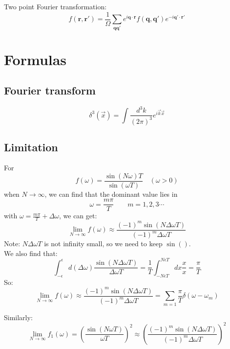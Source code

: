 Two point Fourier transformation:
\begin{equation}
    \displaystyle f(\bm{r,r'}) = \frac{1}{\Omega}\sum_{\bm{qq'}}e^{i\bm{q\cdot r}}f(\bm{q,q'})e^{-i\bm{q'\cdot r'}}
\end{equation}

\section{Formulas}

\subsection{Fourier transform}
\[
    \delta^3(\vec{x})=\int\frac{d^3k}{(2\pi)^3}e^{i\vec{k}\vec{x}}
    \]
\subsection{Limitation}
For 
\[
    f(\omega) = \frac{\sin(N\omega)T}{\sin(\omega T)}   \quad (\omega > 0)
    \]
when $N\rightarrow\infty$, 
we can find that the dominant value lies in 
\[
    \omega = \frac{m\pi}{T} \qquad  m=1,2,3 \cdots
    \]
with $\omega=\frac{m\pi}{T}+\Delta\omega$, we can get:
\begin{equation}
    \displaystyle \lim_{N\rightarrow\infty}f(\omega)\approx\frac{(-1)^m\sin(N\Delta\omega T)}{(-1)^m\Delta\omega T}
\end{equation}
Note: $N\Delta\omega T$ is not infinity small, so we need to keep $\sin()$. \\
We also find that:
\begin{equation}
    \int_{-\epsilon}^{\epsilon}d(\Delta\omega)\frac{\sin(N\Delta\omega T)}{\Delta\omega T}
    =\frac{1}{T}\int_{-N\epsilon T}^{N\epsilon T} dx\frac{x}{x} = \frac{\pi}{T}
\end{equation}
So: 
\begin{equation}
    \displaystyle \lim_{N\rightarrow\infty}f(\omega)\approx\frac{(-1)^m\sin(N\Delta\omega T)}{(-1)^m\Delta\omega T}
    =\displaystyle \sum_{m=1}\frac{\pi}{T}\delta({\omega-\omega_m})
\end{equation}

Similarly:
\begin{equation}
    \displaystyle \lim_{N\rightarrow\infty}f_1(\omega)=\left(\frac{\sin(N\omega T)}{\omega T}\right)^2
    \approx\left(\frac{(-1)^m\sin(N\Delta\omega T)}{(-1)^m\Delta\omega T}\right)^2
\end{equation}


